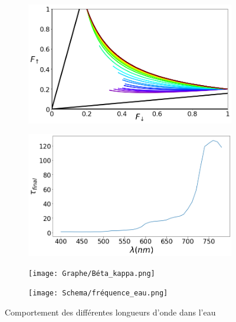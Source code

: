 \documentclass[12pt]{article}
\begin{document}
\begin{figure}[H]
    \centering
    \begin{subfigure}{0.48\textwidth}
        \includegraphics[width=1 \textwidth]{Graphe/eau.png}
        \caption{}
        \label{subfig:graph.eau}
    \end{subfigure}
    \begin{subfigure}{0.48\textwidth}
        \includegraphics[width=1 \textwidth]{Graphe/Tau en fonction longeur d'onde.png}
        \caption{}
        \label{subfig:Tau.long}
    \end{subfigure}
    \begin{subfigure}{0.55\textwidth}
        \texttt{[image: Graphe/Béta\_kappa.png]}
        \caption{}
        \label{subfig:eau beta kappa}
    \end{subfigure}
    \begin{subfigure}{0.39\textwidth}
        \texttt{[image: Schema/fréquence\_eau.png]}
        \caption{}
        \label{subfig:fréquence_eau}
    \end{subfigure}
    \caption{Comportement des différentes longueurs d'onde dans l'eau}

\end{figure}
\end{document}
